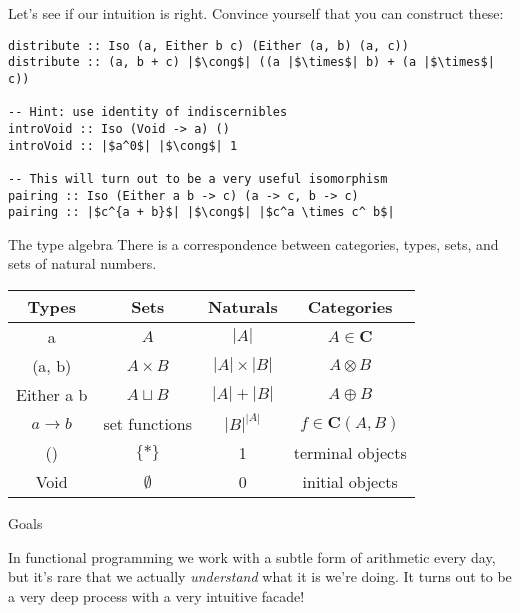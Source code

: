 \documentclass[tikz]{beamer}
\theoremstyle{definition}
\newcommand{\cat}[1]{\mathbf{#1}}
\begin{document}
\begin{frame}[fragile]
Let's see if our intuition is right. Convince yourself that you can construct these:

\begin{verbatim}
distribute :: Iso (a, Either b c) (Either (a, b) (a, c))
distribute :: (a, b + c) |$\cong$| ((a |$\times$| b) + (a |$\times$| c))

-- Hint: use identity of indiscernibles
introVoid :: Iso (Void -> a) ()
introVoid :: |$a^0$| |$\cong$| 1

-- This will turn out to be a very useful isomorphism
pairing :: Iso (Either a b -> c) (a -> c, b -> c)
pairing :: |$c^{a + b}$| |$\cong$| |$c^a \times c^ b$|
\end{verbatim}
\end{frame}

\begin{frame}{The type algebra}
There is a correspondence between categories, types, sets, and sets of natural numbers.

\begin{center}
\begin{tabular}{|c|c|c|c|}
\hline
Types & Sets & Naturals & Categories \\
\hline
a       & $A$ & $|A|$  & $A \in \cat{C}$ \\
(a, b) & $A \times B$ & $|A| \times |B|$ & $A \otimes B$ \\
Either a b & $A \sqcup B$ & $|A| + |B|$ & $A \oplus B$ \\
$a \to b$ &  set functions & $|B|^{|A|}$ & $f \in \cat{C}(A, B)$ \\
() & $\{*\}$ & 1 & terminal objects \\
Void & $\emptyset$ & 0 & initial objects \\ \hline
\end{tabular}
\end{center}
\end{frame}


\begin{frame}{Goals}

    In functional programming we work with a subtle form of arithmetic every day, but it's rare that we actually \textit{understand} what it is we're doing. It turns out to be a very deep process with a very intuitive facade!

\end{frame}
\end{document}
